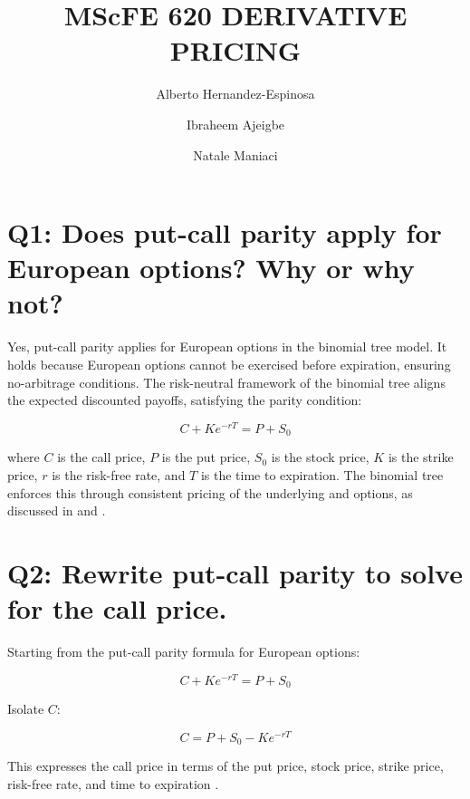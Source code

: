 \documentclass{article}
\begin{document}
\title{MScFE 620 DERIVATIVE PRICING}
\author{Alberto Hernandez-Espinosa \and Ibraheem Ajeigbe \and Natale Maniaci}
\date{}
\maketitle

\section*{Q1: Does put-call parity apply for European options? Why or why not?}

Yes, put-call parity applies for European options in the binomial tree model. It holds because European options cannot be exercised before expiration, ensuring no-arbitrage conditions. The risk-neutral framework of the binomial tree aligns the expected discounted payoffs, satisfying the parity condition:

\begin{equation}
C + Ke^{-rT} = P + S_0
\end{equation}

where $C$ is the call price, $P$ is the put price, $S_0$ is the stock price, $K$ is the strike price, $r$ is the risk-free rate, and $T$ is the time to expiration. The binomial tree enforces this through consistent pricing of the underlying and options, as discussed in \citet{hull2018options} and \citet{cox1979option}.

\section*{Q2: Rewrite put-call parity to solve for the call price.}

Starting from the put-call parity formula for European options:

\begin{equation}
C + Ke^{-rT} = P + S_0
\end{equation}

Isolate $C$:

\begin{equation}
C = P + S_0 - Ke^{-rT}
\end{equation}

This expresses the call price in terms of the put price, stock price, strike price, risk-free rate, and time to expiration \citep{hull2018options}.
\end{document}
